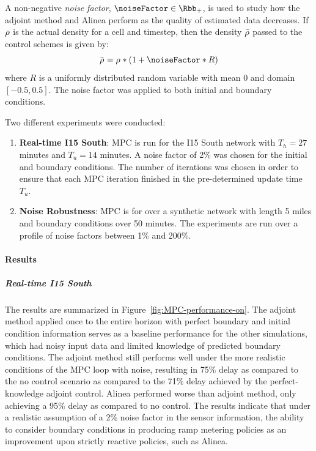 								A non-negative\emph{ noise factor}, $\noiseFactor \in \Rbb_+$, is used to study how the adjoint
								method and Alinea perform as the quality of estimated data decreases. If $\rho$ is the actual density for a cell and timestep, then the density $\bar{\rho}$ passed to the control schemes is given by:
								\[
									\bar{\discrete{}{}}=\discrete{}{}*(1+\noiseFactor*R)
								\]
								where $R$ is a uniformly distributed random variable with mean $0$
								and domain $\left[-0.5,0.5\right]$. The noise factor was applied
								to both initial and boundary conditions.
																
								Two different experiments were conducted:
								\begin{enumerate}
									\item \textbf{Real-time I15 South}: MPC is run for the I15 South network
									with $T_{h}=27$ minutes and $T_{u}=14$ minutes. A noise factor of
									2\% was chosen for the initial and boundary conditions. The number
									of iterations was chosen in order to ensure that each MPC iteration
									finished in the pre-determined update time $T_{u}$.
									\item \textbf{Noise Robustness}: MPC is for over a synthetic network with
									length 5 miles and boundary conditions over 50 minutes. The experiments
									are run over a profile of noise factors between 1\% and 200\%.
								\end{enumerate}
																
								\paragraph{Results}
																
																
								\subparagraph{Real-time I15 South}
																
								The results are summarized in Figure~\ref{fig:MPC-performance-on}.
								The adjoint method applied once to the entire horizon with perfect
								boundary and initial condition information serves as a baseline performance
								for the other simulations, which had noisy input data and limited
								knowledge of predicted boundary conditions. The adjoint method still
								performs well under the more realistic conditions of the MPC loop
								with noise, resulting in 75\% delay as compared to the no control
								scenario as compared to the 71\% delay achieved by the perfect-knowledge
								adjoint control. Alinea performed worse than adjoint method, only
								achieving a 95\% delay as compared to no control. The results indicate
								that under a realistic assumption of a 2\% noise factor in the sensor
								information, the ability to consider boundary conditions in producing
								ramp metering policies as an improvement upon strictly reactive policies,
								such as Alinea.
																
